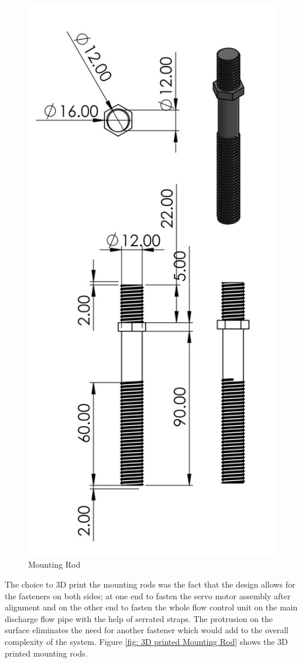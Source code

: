 \begin{enumerate}
\begin{figure}[H]
\includegraphics [width=.5\textwidth]{Figures/ServoMotorMountRods.jpg}
\caption{Mounting Rod}
\label{fig: Mounting Rod}
\end{figure}
The choice to 3D print the mounting rods was the fact that the design allows for the fasteners on both sides; at one end to fasten the servo motor assembly after alignment and on the other end to fasten the whole flow control unit on the main discharge flow pipe with the help of serrated straps. The protrusion on the surface eliminates the need for another fastener which would add to the overall complexity of the system. Figure \ref{fig: 3D printed Mounting Rod} shows the 3D printed mounting rods. 
\begin{figure}[H]
\centering

\end{figure}
\end{enumerate}
